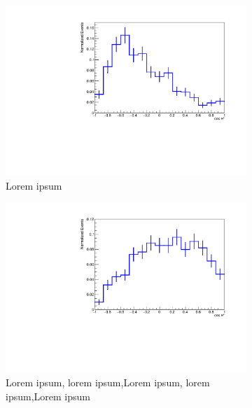 \documentclass[12pt,a4paper]{article}
\begin{document}
\begin{figure}[t!]
    \centering
    \begin{subfigure}[t]{0.5\textwidth}
        \centering
        \includegraphics[width=1.0\textwidth]{figures/delphes_ctstarL}
        \caption{Lorem ipsum}
    \end{subfigure}%
    \begin{subfigure}[t]{0.5\textwidth}
        \centering
        \includegraphics[width=1.0\textwidth]{figures/delphes_ctstarR}
        \caption{Lorem ipsum, lorem ipsum,Lorem ipsum, lorem ipsum,Lorem ipsum}
      \end{subfigure}
    \begin{subfigure}[t]{0.5\textwidth}
        \centering

\end{subfigure}
\end{figure}
\end{document}
